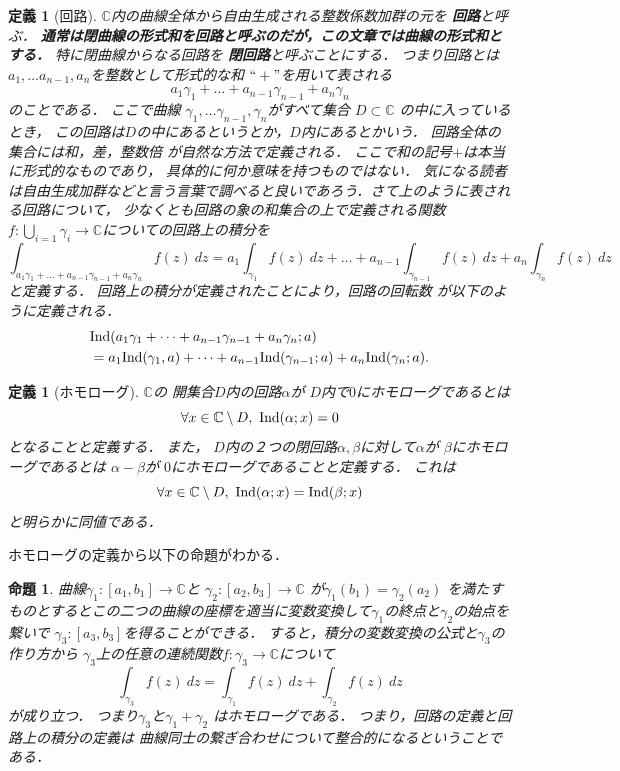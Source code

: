 \documentclass[leqno, 12pt, a4paper]{jsarticle}
\newtheorem{prop}[thm]{命題}
\newtheorem{df}[thm]{定義}
\newcommand{\cc}{\mathbb{C}}
\newcommand{\ind}{\text{{\rm Ind}}}
\begin{document}
\begin{df}[回路]
$\cc$内の曲線全体から自由生成される整数係数加群の元を
\textbf{回路}と呼ぶ．
\textbf{通常は閉曲線の形式和を回路と呼ぶのだが，この文章では曲線の形式和とする．}
特に閉曲線からなる回路を
\textbf{閉回路}と呼ぶことにする．
つまり回路とは$a_1,\dots a_{n-1},a_n$を整数として形式的な和
$``+"$を用いて表される
\[
a_{1}\gamma_{1}+\dots+a_{n-1}\gamma_{n-1}+a_{n}
\gamma_{n}
\]
のことである．
ここで曲線
$\gamma_{1},\dots \gamma_{n-1},\gamma_{n}$がすべて集合
$D\subset \cc$
の中に入っているとき，
この回路は$D$の中にあるというとか，$D$内にあるとかいう．
回路全体の集合には和，差，整数倍
が自然な方法で定義される．
ここで和の記号$+$は本当に形式的なものであり，
具体的に何か意味を持つものではない．
気になる読者は自由生成加群などと言う言葉で調べると良いであろう．さて上のように表される回路について，
少なくとも回路の象の和集合の上で定義される関数$f:\bigcup_{i=1}\gamma_{i}\to \cc$についての回路上の積分を
\[
\int_{a_{1}\gamma_{1}+\dots+a_{n-1}\gamma_{n-1}+a_{n}\gamma_{n}}\!\!\!\!\!f(z)\ dz
=
a_{1}\int_{\gamma_{1}}\!\!f(z)\ dz+
\dots +a_{n-1}\int_{\gamma_{n-1}}\!\!\!\!\!\!
f(z)\ dz
+
a_{n}\int_{\gamma_{n}}\!\!f(z)\ dz\
\]
と定義する．
回路上の積分が定義されたことにより，回路の回転数
が以下のように定義される．
\begin{align*}
&\ind(a_1\gamma_1+\dots+a_{n-1}\gamma_{n-1}+a_n\gamma_n;a)
\\
&=
a_{1}\ind(\gamma_{1}, a)+\dots+
a_{n-1}\ind(\gamma_{n-1};a)+
a_{n}\ind(\gamma_{n}; a).
\end{align*}
\end{df}


\begin{df}[ホモローグ]
$\cc$の
開集合$D$内の回路$\alpha$が
$D$内で$0$にホモローグであるとは
\[
\forall x\in \cc\setminus D, \ \ind(\alpha;x)=0
\]
となることと定義する．
また，
$D$内の２つの閉回路$\alpha, \beta$に対して$\alpha$が
$\beta$にホモローグであるとは
$\alpha-\beta$が
$0$にホモローグであることと定義する．
これは
\[
\forall x\in \cc \setminus D, \ \ind(\alpha;x)=\ind(\beta;x)
\]
と明らかに同値である．
\end{df}
ホモローグの定義から以下の命題がわかる．
\begin{prop}\label{prop:homhom}
曲線$\gamma_{1}:[a_{1}, b_{1}]\to \cc$と
$\gamma_{2}: [a_{2}, b_{3}]\to \cc$
が$\gamma_{1}(b_{1})=\gamma_{2}(a_{2})$
を満たすものとするとこの二つの曲線の座標を適当に変数変換して$\gamma_{1}$の終点と$\gamma_{2}$の始点を繋いで
$\gamma_{3}: [a_{3}, b_{3}]$を得ることができる．
すると，積分の変数変換の公式と$\gamma_{3}$の作り方から
$\gamma_{3}$上の任意の連続関数$f: \gamma_{3}\to \cc$について
\[
\int_{\gamma_{3}} f(z)\ dz
=\int_{\gamma_{1}}f(z)\ dz+
\int_{\gamma_{2}}f(z)\ dz
\]
が成り立つ．
つまり$\gamma_{3}$と$\gamma_{1}+\gamma_{2}$
はホモローグである．
つまり，回路の定義と回路上の積分の定義は
曲線同士の繋ぎ合わせについて整合的になるということである．
\end{prop}
\end{document}
